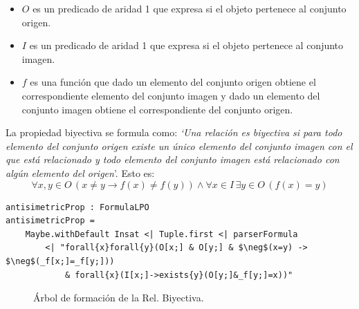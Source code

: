 \documentclass[a4paper]{report}
\begin{document}
\begin{itemize}
\begin{itemize}
\item $O$ es un predicado de aridad 1 que expresa si el objeto pertenece al conjunto origen. 
\item $I$ es un predicado de aridad 1 que expresa si el objeto pertenece al conjunto imagen. 
\item $f$ es una función que dado un elemento del conjunto origen obtiene el correspondiente elemento del conjunto imagen y dado un elemento del conjunto imagen obtiene el correspondiente del conjunto origen. 
\end{itemize}

La propiedad biyectiva se formula como: \textit{`Una relación es biyectiva si para todo elemento del conjunto origen existe un único elemento del conjunto imagen con el que está relacionado y todo elemento del conjunto imagen está relacionado con algún elemento del origen}'. Esto es: $$ \forall x,y \in O \, (x \neq y \rightarrow f(x) \neq f(y)) \wedge \forall x \in I \, \exists y \in O \, (f(x)=y)$$

\begin{lstlisting}[caption={ParserLPO. Definición de la de la Rel. Biyectiva.}, mathescape=true]
antisimetricProp : FormulaLPO
antisimetricProp = 
    Maybe.withDefault Insat <| Tuple.first <| parserFormula 
        <| "forall{x}forall{y}(O[x;] & O[y;] & $\neg$(x=y) -> $\neg$(_f[x;]=_f[y;])) 
            & forall{x}(I[x;]->exists{y}(O[y;]&_f[y;]=x))"
\end{lstlisting}

\begin{figure}[H]
\centering
{}
\caption{Árbol de formación de la Rel. Biyectiva.}
\end{figure}

\end{itemize}
\end{document}

